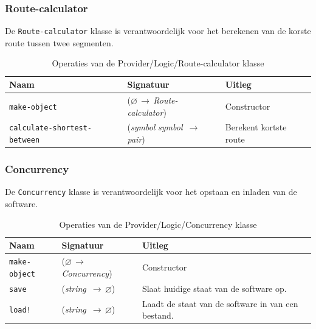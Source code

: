 \documentclass[a4paper, 11pt]{article}
\newcommand{\naar}{\,$\rightarrow$\,}
\renewcommand{\empty}{$\varnothing$}
\newcommand{\<}{\scriptsize\textless\normalsize}
\renewcommand{\>}{\scriptsize\textgreater\normalsize}
\begin{document}
\subsubsection{Route-calculator} %
De \texttt{Route-calculator} klasse is verantwoordelijk voor het berekenen van de korste route tussen twee segmenten.
\begin{table}[H]
	\begin{center}
		\begin{tabular}{|l l l|}
			\hline
			\textbf{Naam} & \textbf{Signatuur} & \textbf{Uitleg}\\
			\hline
			\texttt{make-object} & (\empty \naar \textit{Route-calculator}) & Constructor\\
			\hline
			\texttt{calculate-shortest-between} & (\textit{symbol} \textit{symbol} \naar \textit{pair}) & Berekent kortste route\\
			\hline
		\end{tabular}
		\caption{Operaties van de Provider/Logic/Route-calculator klasse}
	\end{center}
\end{table}

\newpage

\subsubsection{Concurrency} %
De \texttt{Concurrency} klasse is verantwoordelijk voor het opstaan en inladen van de software.
\begin{table}[H]
	\begin{center}
		\begin{tabular}{|l l l|}
			\hline
			\textbf{Naam} & \textbf{Signatuur} & \textbf{Uitleg}\\
			\hline
			\texttt{make-object} & (\empty \naar \textit{Concurrency}) & Constructor\\
			\hline
			\texttt{save} & (\textit{string} \naar \empty) & Slaat huidige staat van de software op.\\
			\texttt{load!} & (\textit{string} \naar \empty) & Laadt de staat van de software in van een bestand.\\
			\hline
		\end{tabular}
		\caption{Operaties van de Provider/Logic/Concurrency klasse}
	\end{center}
\end{table}
\end{document}
